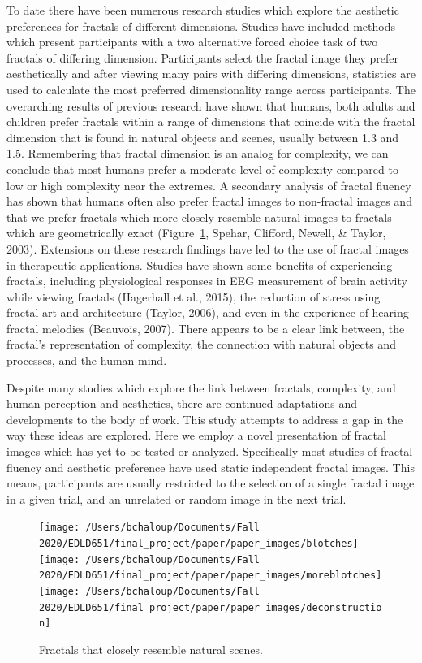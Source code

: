 \documentclass[english,jou]{apa6}
\begin{document}
To date there have been numerous research studies which explore the aesthetic preferences for fractals of different dimensions. Studies have included methods which present participants with a two alternative forced choice task of two fractals of differing dimension. Participants select the fractal image they prefer aesthetically and after viewing many pairs with differing dimensions, statistics are used to calculate the most preferred dimensionality range across participants. The overarching results of previous research have shown that humans, both adults and children prefer fractals within a range of dimensions that coincide with the fractal dimension that is found in natural objects and scenes, usually between 1.3 and 1.5. Remembering that fractal dimension is an analog for complexity, we can conclude that most humans prefer a moderate level of complexity compared to low or high complexity near the extremes. A secondary analysis of fractal fluency has shown that humans often also prefer fractal images to non-fractal images and that we prefer fractals which more closely resemble natural images to fractals which are geometrically exact (Figure~\ref{fig:natural}, Spehar, Clifford, Newell, \& Taylor, 2003). Extensions on these research findings have led to the use of fractal images in therapeutic applications. Studies have shown some benefits of experiencing fractals, including physiological responses in EEG measurement of brain activity while viewing fractals (Hagerhall et al., 2015), the reduction of stress using fractal art and architecture (Taylor, 2006), and even in the experience of hearing fractal melodies (Beauvois, 2007). There appears to be a clear link between, the fractal's representation of complexity, the connection with natural objects and processes, and the human mind.

Despite many studies which explore the link between fractals, complexity, and human perception and aesthetics, there are continued adaptations and developments to the body of work. This study attempts to address a gap in the way these ideas are explored. Here we employ a novel presentation of fractal images which has yet to be tested or analyzed. Specifically most studies of fractal fluency and aesthetic preference have used static independent fractal images. This means, participants are usually restricted to the selection of a single fractal image in a given trial, and an unrelated or random image in the next trial.

\begin{figure}

{\centering \texttt{[image: /Users/bchaloup/Documents/Fall 2020/EDLD651/final\_project/paper/paper\_images/blotches]} \texttt{[image: /Users/bchaloup/Documents/Fall 2020/EDLD651/final\_project/paper/paper\_images/moreblotches]} \texttt{[image: /Users/bchaloup/Documents/Fall 2020/EDLD651/final\_project/paper/paper\_images/deconstruction]} 

}

\caption{Fractals that closely resemble natural scenes.}\label{fig:natural}
\end{figure}
\end{document}
